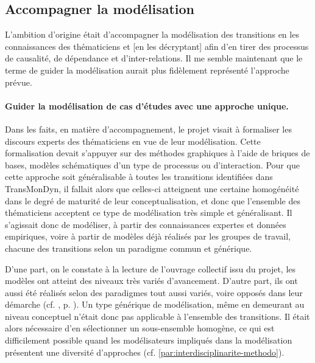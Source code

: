 \subsection[Accompagner la modélisation]{Accompagner la modélisation}

L'ambition d'origine était d'accompagner la modélisation des transitions en \og [extrayant] les connaissances des thématiciens et [en les décryptant] afin d'en tirer des processus de causalité, de dépendance et d'inter-relations\fg{}.
Il me semble maintenant que le terme de \og guider\fg{} la modélisation aurait plus fidèlement représenté l'approche prévue.

\paragraph{Guider la modélisation de cas d'études avec une approche unique.}

Dans les faits, en matière d'accompagnement, le projet visait à formaliser les discours experts des thématiciens en vue de leur modélisation.
Cette formalisation devait s'appuyer sur des méthodes graphiques à l'aide de \og briques de bases\fg{}, modèles schématiques d'un type de processus ou d'interaction.
Pour que cette approche soit généralisable à toutes les transitions identifiées dans TransMonDyn, il fallait alors que celles-ci atteignent une certaine homogénéité dans le degré de maturité de leur conceptualisation, et donc que l'ensemble des thématiciens acceptent ce type de modélisation très simple et généralisant.
Il s'agissait donc de modéliser, à partir des connaissances expertes et données empiriques, voire à partir de modèles déjà réalisés par les groupes de travail, chacune des transitions selon un paradigme commun et générique.

D'une part, on le constate à la lecture de l'ouvrage collectif issu du projet, les modèles ont atteint des niveaux très variés d'avancement.
D'autre part, ils ont aussi été réalisés selon des paradigmes tout aussi variés, voire opposés dans leur démarche (cf. , p. \pageref{par:interdisciplinarite-methodo}).
Un type générique de modélisation, même en demeurant au niveau conceptuel n'était donc pas applicable à l'ensemble des transitions.
Il était alors nécessaire d'en sélectionner un sous-ensemble homogène, ce qui est difficilement possible quand les modélisateurs impliqués dans la modélisation présentent une diversité d'approches (cf. \cref{par:interdisciplinarite-methodo}).

